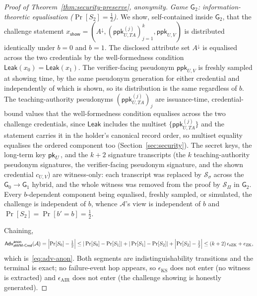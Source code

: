 \begin{proof}[Proof of Theorem~\ref{thm:security-preserve}, anonymity]
    \smallskip\noindent\emph{Game $\mathsf G_2$: information-theoretic
equalisation ($\Pr[S_2]=\tfrac12$).} We show, self-contained inside $\mathsf G_2$, that the challenge statement $x_{\mathsf{show}}=(A^\downarrow,(\mathsf{ppk}_{U,TA}^{(j)})_{j=1}^{k}, \mathsf{ppk}_{U,V})$ is distributed identically under $b=0$ and $b=1$. The disclosed attribute set $A^\downarrow$ is equalised across the two credentials by the well-formedness condition $\mathsf{Leak}(x_0)=\mathsf{Leak}(x_1)$. The verifier-facing pseudonym $\mathsf{ppk}_{U,V}$ is freshly sampled at showing time, by the same pseudonym generation for either credential and independently of which is shown, so its distribution is the same regardless of $b$. The teaching-authority pseudonyms $(\mathsf{ppk}_{U,TA}^{(j)})_{j}$ are issuance-time, credential-bound values that the well-formedness condition equalises across the two challenge credentials, since $\mathsf{Leak}$ includes the multiset $\{\mathsf{ppk}_{U,TA}^{(j)}\}$ and the statement carries it in the holder's canonical record order, so multiset equality equalises the ordered component too (Section~\ref{sec:security}). The secret keys, the long-term key $\mathsf{pk}_U$, and the $k+2$ signature transcripts (the $k$ teaching-authority pseudonym signatures, the verifier-facing pseudonym signature, and the shown credential $c_{U,V}$) are witness-only: each transcript was replaced by $\mathcal S_\sigma$ across the $\mathsf G_0\to\mathsf G_1$ hybrid, and the whole witness was removed from the proof by $\mathcal S_\Pi$ in $\mathsf G_2$. Every $b$-dependent component being equalised, freshly sampled, or simulated, the challenge is independent of $b$, whence $\mathcal A$'s view is independent of $b$ and $\Pr[S_2]=\Pr[b'=b]=\tfrac12$.

    \smallskip\noindent Chaining,
    \[
      \mathsf{Adv}^{\mathsf{anon}}_{\mathsf{zkVM\text{-}Cred}}(\mathcal A)
      =\Bigl|\Pr[S_0]-\tfrac12\Bigr|
      \le |\Pr[S_0]-\Pr[S_1]|+|\Pr[S_1]-\Pr[S_2]|+\Bigl|\Pr[S_2]-\tfrac12\Bigr|
      \le (k+2)\,\epsilon_{\mathrm{sZK}}+\epsilon_{\mathrm{ZK}},
    \]
which is~\eqref{eq:adv-anon}. Both segments are indistinguishability transitions and the terminal is exact; no failure-event hop appears, so $\epsilon_{\mathrm{KS}}$ does not enter (no witness is extracted) and $\epsilon_{\mathrm{AIR}}$ does not enter (the challenge showing is honestly generated).
\end{proof}

